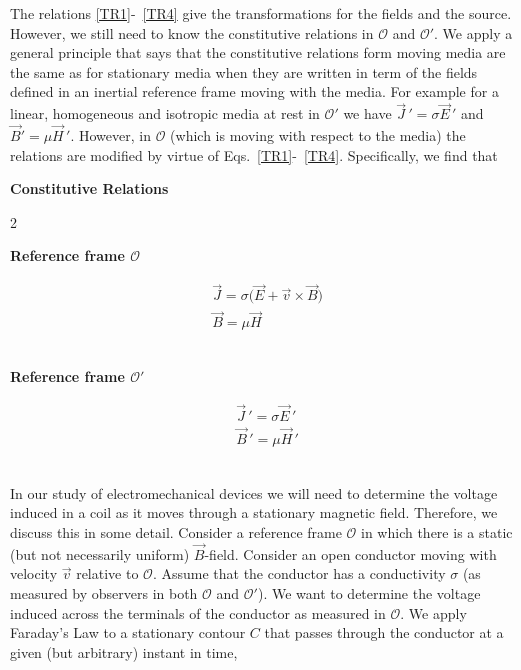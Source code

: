 \documentclass[12pt,a4paper,oneside]{book}
\begin{document}
\begin{onehalfspace}
The relations \ref{TR1}-~\ref{TR4} give the transformations for the fields and the source. However, we still need to know the constitutive relations in $\mathcal{O}$ and $\mathcal{O'}$. We apply a general principle that says that the constitutive relations form moving media are the same as for stationary media when they are written in term of the fields defined in an inertial reference frame moving with the media. For example for a linear, homogeneous and isotropic media at rest in $\mathcal{O'}$ we have $\vec{J}\,' = \sigma\vec{E}\,'$ and $\vec{B}'=\mu\vec{H}\,'$. However, in $\mathcal{O}$ (which is moving with respect to the media) the relations are modified by virtue of Eqs.~\eqref{TR1}-~\ref{TR4}. Specifically, we find that
\setlength{\columnseprule}{1pt}
\bigskip
\ \newline \centerline{\textbf{Constitutive Relations}}
\begin{multicols}{2}
	\centerline{\textbf{Reference frame $\mathcal{O}$}}	
	\begin{equation*}
		\begin{aligned}
			&\vec{J} =  \sigma\big(\vec{E}+\vec{v}\times\vec{B}\big) \\[8pt]
			&\vec{B} =  \mu\vec{H}
		\end{aligned}
	\end{equation*} 
	\ \newline
	\columnbreak
	\ \newline
	\centerline{\textbf{Reference frame $\mathcal{O'}$}}	
	\begin{equation}
		\begin{aligned}
			&\vec{J}\,' =  \sigma\vec{E}\,' \\[8pt]
			&\vec{B}\,' =  \mu\vec{H}\,'
		\end{aligned}
	\end{equation} 
	\ \newline
\end{multicols}
In our study of electromechanical devices we will need to determine the voltage induced in a coil as it moves through a stationary magnetic field. Therefore, we discuss this in some detail. Consider a reference frame $\mathcal{O}$ in which there is a static (but not necessarily uniform) $\vec{B}$-field. Consider an open conductor moving with velocity $\vec{v}$ relative to $\mathcal{O}$. Assume that the conductor has a conductivity $\sigma$ (as measured by observers in both $\mathcal{O}$ and $\mathcal{O}'$). We want to determine the voltage induced across the terminals of the conductor as measured in $\mathcal{O}$. We apply Faraday's Law to a stationary contour $C$ that passes through the conductor at a given (but arbitrary) instant in time,

\end{onehalfspace}
\end{document}
